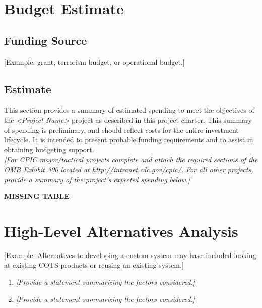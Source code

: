 \documentclass[a4paper, 11pt]{article}
\begin{document}
\hypertarget{budget-estimate}{%
\section{Budget Estimate}\label{budget-estimate}}

\hypertarget{funding-source}{%
\subsection{Funding Source}\label{funding-source}}

{[}Example: grant, terrorism budget, or operational budget.{]}

\hypertarget{estimate}{%
\subsection{Estimate}\label{estimate}}

This section provides a summary of estimated spending to meet the
objectives of the \emph{\textless{}Project Name\textgreater{}} project
as described in this project charter. This summary of spending is
preliminary, and should reflect costs for the entire investment
lifecycle. It is intended to present probable funding requirements and
to assist in obtaining budgeting support.\\
\emph{{[}For CPIC major/tactical projects complete and attach the
required sections of the \href{http://intranet.cdc.gov/cpic/}{OMB
Exhibit 300} located at \url{http://intranet.cdc.gov/cpic/}. For all
other projects, provide a summary of the project's expected spending}
\emph{below.{]}}

\textbf{MISSING TABLE} %

\hypertarget{high-level-alternatives-analysis}{%
\section{High-Level Alternatives Analysis}\label{high-level-alternatives-analysis}}

{[}Example: Alternatives to developing a custom system may have included
looking at existing COTS products or reusing an existing system.{]}

\begin{enumerate}
\def\labelenumi{\arabic{enumi}.}
\item
  \emph{{[}Provide a statement summarizing the factors considered.{]}}
\item
  \emph{{[}Provide a statement summarizing the factors considered.{]}}
\end{enumerate}
\end{document}

